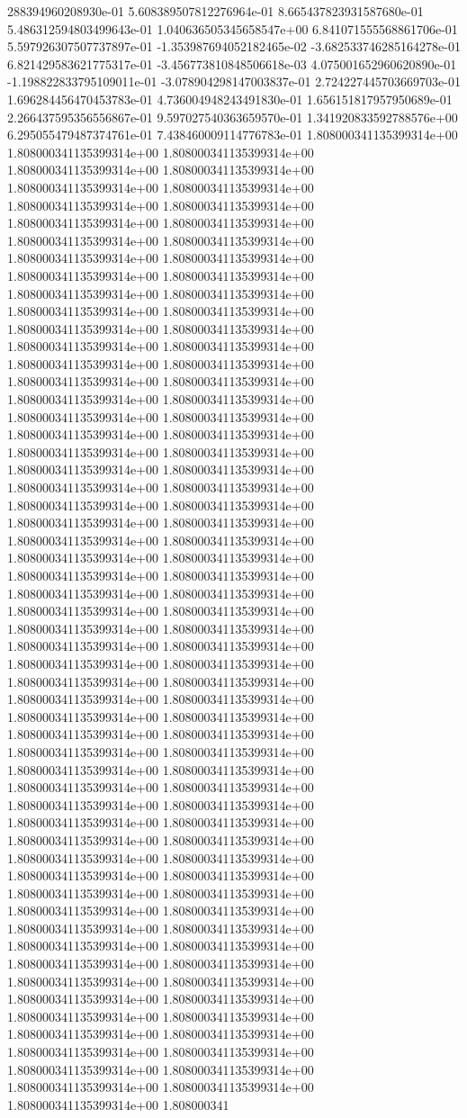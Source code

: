 288394960208930e-01	5.608389507812276964e-01	8.665437823931587680e-01	5.486312594803499643e-01	1.040636505345658547e+00	6.841071555568861706e-01	5.597926307507737897e-01	-1.353987694052182465e-02	-3.682533746285164278e-01	6.821429583621775317e-01	-3.456773810848506618e-03	4.075001652960620890e-01	-1.198822833795109011e-01	-3.078904298147003837e-01	2.724227445703669703e-01	1.696284456470453783e-01	4.736004948243491830e-01	1.656151817957950689e-01	2.266437595356556867e-01	9.597027540363659570e-01	1.341920833592788576e+00	6.295055479487374761e-01	7.438460009114776783e-01
1.808000341135399314e+00	1.808000341135399314e+00	1.808000341135399314e+00	1.808000341135399314e+00	1.808000341135399314e+00	1.808000341135399314e+00	1.808000341135399314e+00	1.808000341135399314e+00	1.808000341135399314e+00	1.808000341135399314e+00	1.808000341135399314e+00	1.808000341135399314e+00	1.808000341135399314e+00	1.808000341135399314e+00	1.808000341135399314e+00	1.808000341135399314e+00	1.808000341135399314e+00	1.808000341135399314e+00	1.808000341135399314e+00	1.808000341135399314e+00	1.808000341135399314e+00	1.808000341135399314e+00	1.808000341135399314e+00	1.808000341135399314e+00	1.808000341135399314e+00	1.808000341135399314e+00	1.808000341135399314e+00	1.808000341135399314e+00	1.808000341135399314e+00	1.808000341135399314e+00	1.808000341135399314e+00	1.808000341135399314e+00	1.808000341135399314e+00	1.808000341135399314e+00	1.808000341135399314e+00	1.808000341135399314e+00	1.808000341135399314e+00	1.808000341135399314e+00	1.808000341135399314e+00	1.808000341135399314e+00	1.808000341135399314e+00	1.808000341135399314e+00	1.808000341135399314e+00	1.808000341135399314e+00	1.808000341135399314e+00	1.808000341135399314e+00	1.808000341135399314e+00	1.808000341135399314e+00	1.808000341135399314e+00	1.808000341135399314e+00	1.808000341135399314e+00	1.808000341135399314e+00	1.808000341135399314e+00	1.808000341135399314e+00	1.808000341135399314e+00	1.808000341135399314e+00	1.808000341135399314e+00	1.808000341135399314e+00	1.808000341135399314e+00	1.808000341135399314e+00	1.808000341135399314e+00	1.808000341135399314e+00	1.808000341135399314e+00	1.808000341135399314e+00	1.808000341135399314e+00	1.808000341135399314e+00	1.808000341135399314e+00	1.808000341135399314e+00	1.808000341135399314e+00	1.808000341135399314e+00	1.808000341135399314e+00	1.808000341135399314e+00	1.808000341135399314e+00	1.808000341135399314e+00	1.808000341135399314e+00	1.808000341135399314e+00	1.808000341135399314e+00	1.808000341135399314e+00	1.808000341135399314e+00	1.808000341135399314e+00	1.808000341135399314e+00	1.808000341135399314e+00	1.808000341135399314e+00	1.808000341135399314e+00	1.808000341135399314e+00	1.808000341135399314e+00	1.808000341135399314e+00	1.808000341135399314e+00	1.808000341135399314e+00	1.808000341135399314e+00	1.808000341135399314e+00	1.808000341135399314e+00	1.808000341135399314e+00	1.808000341135399314e+00	1.808000341135399314e+00	1.808000341135399314e+00	1.808000341135399314e+00	1.808000341135399314e+00	1.808000341135399314e+00	1.808000341135399314e+00	1.808000341135399314e+00	1.808000341135399314e+00	1.808000341135399314e+00	1.808000341135399314e+00	1.808000341135399314e+00	1.808000341135399314e+00	1.808000341135399314e+00	1.808000341135399314e+00	1.808000341135399314e+00	1.808000341135399314e+00	1.808000341